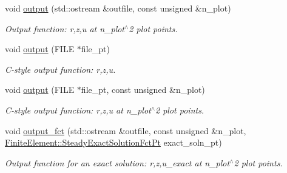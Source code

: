 \begin{DoxyCompactItemize}
void \hyperlink{classoomph_1_1QSphericalAdvectionDiffusionElement_abc3c98e85e168e66999ccae5a35e0987}{output} (std\+::ostream \&outfile, const unsigned \&n\+\_\+plot)
\begin{DoxyCompactList}\small\item\em Output function\+: r,z,u at n\+\_\+plot$^\wedge$2 plot points. \end{DoxyCompactList}\item 
void \hyperlink{classoomph_1_1QSphericalAdvectionDiffusionElement_a160d448e9026e125714d38a4550676a4}{output} (F\+I\+LE $\ast$file\+\_\+pt)
\begin{DoxyCompactList}\small\item\em C-\/style output function\+: r,z,u. \end{DoxyCompactList}\item 
void \hyperlink{classoomph_1_1QSphericalAdvectionDiffusionElement_a16854bbf99abd7b8512474992a29f72b}{output} (F\+I\+LE $\ast$file\+\_\+pt, const unsigned \&n\+\_\+plot)
\begin{DoxyCompactList}\small\item\em C-\/style output function\+: r,z,u at n\+\_\+plot$^\wedge$2 plot points. \end{DoxyCompactList}\item 
void \hyperlink{classoomph_1_1QSphericalAdvectionDiffusionElement_ae67830606f8940978529b305794ec98d}{output\+\_\+fct} (std\+::ostream \&outfile, const unsigned \&n\+\_\+plot, \hyperlink{classoomph_1_1FiniteElement_a690fd33af26cc3e84f39bba6d5a85202}{Finite\+Element\+::\+Steady\+Exact\+Solution\+Fct\+Pt} exact\+\_\+soln\+\_\+pt)
\begin{DoxyCompactList}\small\item\em Output function for an exact solution\+: r,z,u\+\_\+exact at n\+\_\+plot$^\wedge$2 plot points. \end{DoxyCompactList}\end{DoxyCompactItemize}
